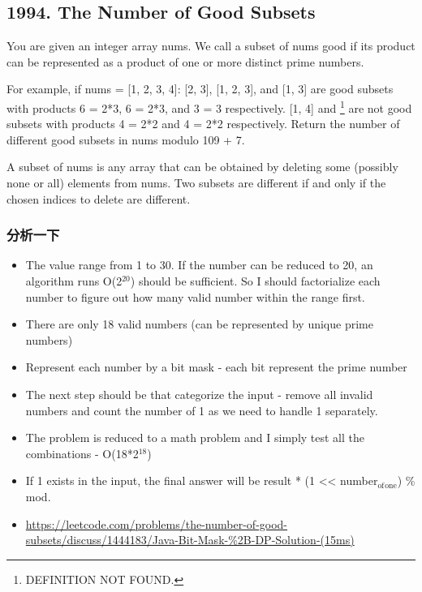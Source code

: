 \documentclass[9pt, b5paper]{article}
\begin{document}
\subsection{1994. The Number of Good Subsets}
\label{sec-3-8}
You are given an integer array nums. We call a subset of nums good if its product can be represented as a product of one or more distinct prime numbers.

For example, if nums = [1, 2, 3, 4]:
[2, 3], [1, 2, 3], and [1, 3] are good subsets with products 6 = 2*3, 6 = 2*3, and 3 = 3 respectively.
[1, 4] and \footnote{DEFINITION NOT FOUND.} are not good subsets with products 4 = 2*2 and 4 = 2*2 respectively.
Return the number of different good subsets in nums modulo 109 + 7.

A subset of nums is any array that can be obtained by deleting some (possibly none or all) elements from nums. Two subsets are different if and only if the chosen indices to delete are different.
\subsubsection{分析一下}
\label{sec-3-8-1}
\begin{itemize}
\item The value range from 1 to 30. If the number can be reduced to 20, an algorithm runs O(2$^{\text{20}}$) should be sufficient. So I should factorialize each number to figure out how many valid number within the range first.
\item There are only 18 valid numbers (can be represented by unique prime numbers)
\item Represent each number by a bit mask - each bit represent the prime number
\item The next step should be that categorize the input - remove all invalid numbers and count the number of 1 as we need to handle 1 separately.
\item The problem is reduced to a math problem and I simply test all the combinations - O(18*2$^{\text{18}}$)
\item If 1 exists in the input, the final answer will be result * (1 << number$_{\text{of}}$$_{\text{one}}$) \% mod.
\item \url{https://leetcode.com/problems/the-number-of-good-subsets/discuss/1444183/Java-Bit-Mask-\%2B-DP-Solution-(15ms)}
\end{itemize}
\end{document}
